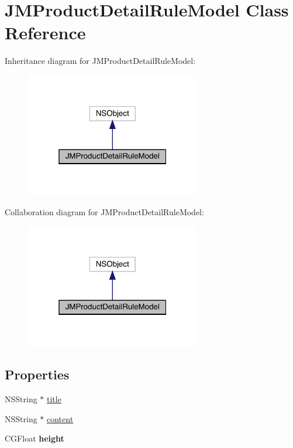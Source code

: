 \hypertarget{interface_j_m_product_detail_rule_model}{}\section{J\+M\+Product\+Detail\+Rule\+Model Class Reference}
\label{interface_j_m_product_detail_rule_model}


Inheritance diagram for J\+M\+Product\+Detail\+Rule\+Model\+:\nopagebreak
\begin{figure}[H]
\begin{center}
\leavevmode
\includegraphics[width=217pt]{interface_j_m_product_detail_rule_model__inherit__graph}
\end{center}
\end{figure}


Collaboration diagram for J\+M\+Product\+Detail\+Rule\+Model\+:\nopagebreak
\begin{figure}[H]
\begin{center}
\leavevmode
\includegraphics[width=217pt]{interface_j_m_product_detail_rule_model__coll__graph}
\end{center}
\end{figure}
\subsection*{Properties}
\begin{DoxyCompactItemize}
\item 
N\+S\+String $\ast$ \mbox{\hyperlink{interface_j_m_product_detail_rule_model_ab741c0f925a8cfb0171fe389074e0ff7}{title}}
\item 
N\+S\+String $\ast$ \mbox{\hyperlink{interface_j_m_product_detail_rule_model_a5923ae598c60f496584be9c8ce430d66}{content}}
\item 
\mbox{\label{interface_j_m_product_detail_rule_model_a50fab349604d4a63ec8efef0f3bb9e7b}} 
C\+G\+Float {\bfseries height}
\end{DoxyCompactItemize}


